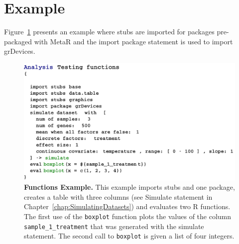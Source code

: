 \section{Example}
Figure~\ref{fig:TestinFunctionsExample} presents an example where stubs are imported for packages pre-packaged with MetaR and the import package statement is used to import grDevices.
\begin{figure}[h!tbp]
  \centering
  \includegraphics[width=\figWidthWide]{figures/TestinFunctionsExample.pdf}
\caption[Functions Example.]{\textbf{Functions Example.} This example imports stubs and one package, creates a table with three columns (see Simulate statement in Chapter~\ref{chap:SimulatingDatasets}) and evaluates two R functions. The first use of the \texttt{boxplot} function plots the values of the column \texttt{sample\_1\_treatment} that was generated with the simulate statement. The second call to \texttt{boxplot} is given a list of four integers.}
\label{fig:TestinFunctionsExample}
\end{figure}


